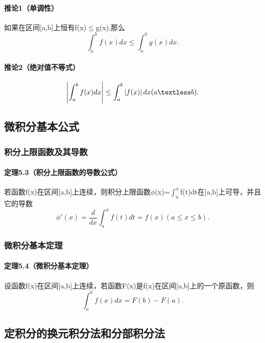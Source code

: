 \documentclass[12pt, a4paper, oneside]{ctexart}
\begin{document}
\paragraph{推论1（单调性）}如果在区间[a,b]上恒有f(x)$\leq$g(x),那么
\begin{equation}
	\int_{a}^{b}f(x)dx\leq \int _{a}^{b}g(x)dx.
\end{equation} 

\paragraph{推论2（绝对值不等式）}
\begin{equation}
	\left|\int_{a}^{b}f(x)dx\right|\leq \int _{a}^{b}\left|f(x)\right|dx(a \textless b).
\end{equation} 

\vskip 1cm
\subsection{微积分基本公式}
\subsubsection{积分上限函数及其导数}
\paragraph{定理5.3（积分上限函数的导数公式）}若函数f(x)在区间[a,b]上连续，则积分上限函数$\phi$(x)=$\int_{a}^{x}$f(t)dt在[a,b]上可导，并且它的导数
\begin{equation}
	\phi'(x)=\frac{d}{dx}\int _{a}^{x}f(t)dt=f(x)(a\leq x\leq b).
\end{equation}

\subsubsection{微积分基本定理}
\paragraph{定理5.4（微积分基本定理）}设函数f(x)在区间[a,b]上连续，若函数F(x)是f(x)在区间[a,b]上的一个原函数，则
\begin{equation}
	\int_{a}^{b}f(x)dx=F(b)-F(a).
\end{equation}

\vskip 2cm
\subsection{定积分的换元积分法和分部积分法}
\vskip 1cm
\end{document}

